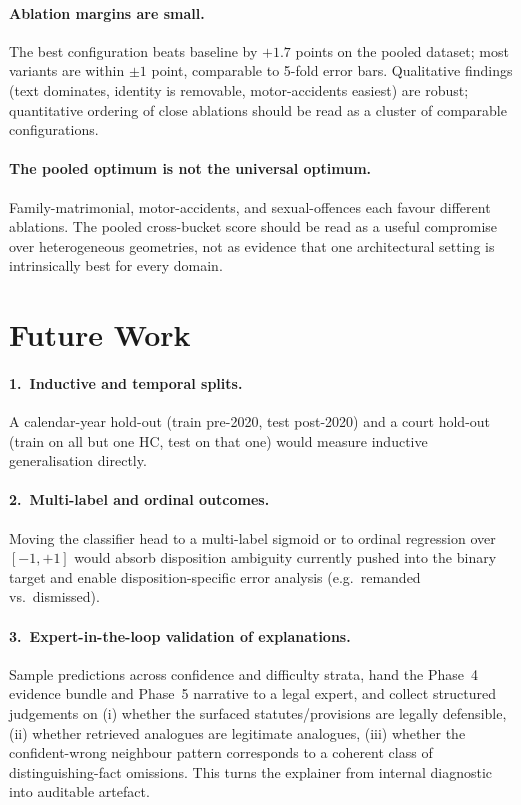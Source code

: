 \paragraph{Ablation margins are small.} The best configuration beats baseline by $+1.7$ points on the pooled dataset; most variants are within $\pm 1$ point, comparable to 5-fold error bars. Qualitative findings (text dominates, identity is removable, motor-accidents easiest) are robust; quantitative ordering of close ablations should be read as a cluster of comparable configurations.

\paragraph{The pooled optimum is not the universal optimum.} Family-matrimonial, motor-accidents, and sexual-offences each favour different ablations. The pooled cross-bucket score should be read as a useful compromise over heterogeneous geometries, not as evidence that one architectural setting is intrinsically best for every domain.

\section{Future Work}

\paragraph{1.\ Inductive and temporal splits.} A calendar-year hold-out (train pre-2020, test post-2020) and a court hold-out (train on all but one HC, test on that one) would measure inductive generalisation directly.

\paragraph{2.\ Multi-label and ordinal outcomes.} Moving the classifier head to a multi-label sigmoid or to ordinal regression over $[-1,+1]$ would absorb disposition ambiguity currently pushed into the binary target and enable disposition-specific error analysis (e.g.\ remanded vs.\ dismissed).

\paragraph{3.\ Expert-in-the-loop validation of explanations.} Sample predictions across confidence and difficulty strata, hand the Phase~4 evidence bundle and Phase~5 narrative to a legal expert, and collect structured judgements on (i) whether the surfaced statutes/provisions are legally defensible, (ii) whether retrieved analogues are legitimate analogues, (iii) whether the confident-wrong neighbour pattern corresponds to a coherent class of distinguishing-fact omissions. This turns the explainer from internal diagnostic into auditable artefact.

